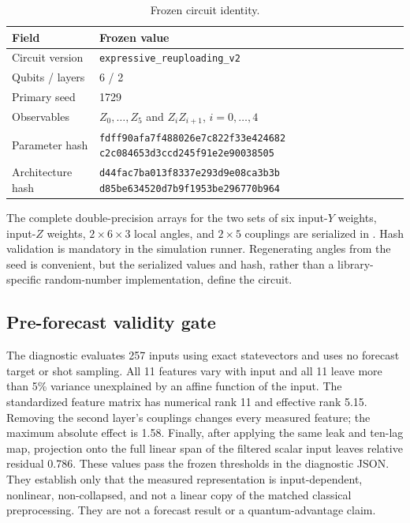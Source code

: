 \documentclass[10pt,conference]{IEEEtran}
\begin{document}
\begin{table}[t]
\caption{Frozen circuit identity.}
\label{tab:supp-hashes}
\centering
\begin{tabular}{p{}p{}}
\toprule
Field & Frozen value \\
\midrule
Circuit version & \texttt{expressive\_reuploading\_v2} \\
Qubits / layers & 6 / 2 \\
Primary seed & 1729 \\
Observables & $Z_0,\ldots,Z_5$ and $Z_iZ_{i+1}$, $i=0,\ldots,4$ \\
Parameter hash & \scriptsize\texttt{fdff90afa7f488026e7c822f33e424682}\newline
  \texttt{c2c084653d3ccd245f91e2e90038505} \\
Architecture hash & \scriptsize\texttt{d44fac7ba013f8337e293d9e08ca3b3b}\newline
  \texttt{d85be634520d7b9f1953be296770b964} \\
\bottomrule
\end{tabular}
\end{table}

The complete double-precision arrays for the two sets of six input-$Y$
weights, input-$Z$ weights, $2\times6\times3$ local angles, and $2\times5$
couplings are serialized in
. Hash validation is
mandatory in the simulation runner. Regenerating angles from the seed is convenient, but
the serialized values and hash, rather than a library-specific random-number
implementation, define the circuit.

\subsection{Pre-forecast validity gate}

The diagnostic evaluates 257 inputs using exact statevectors and uses no
forecast target or shot sampling.  All 11 features vary with input and all 11
leave more than 5\% variance unexplained by an affine function of the input.
The standardized feature matrix has numerical rank 11 and effective rank
5.15.  Removing the second layer's couplings changes every measured feature;
the maximum absolute effect is 1.58.  Finally, after applying the same leak and
ten-lag map, projection onto the full linear span of the filtered scalar input
leaves relative residual 0.786.  These values pass the frozen thresholds in
the diagnostic JSON.  They establish only that the measured representation is
input-dependent, nonlinear, non-collapsed, and not a linear copy of the matched
classical preprocessing.  They are not a forecast result or a quantum-advantage
claim.
\end{document}
